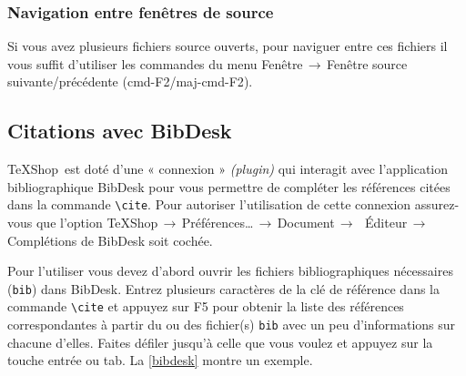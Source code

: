 \documentclass[11pt,french]{article}
\newcommand{\TS}{\textsf{\TeX Shop}}
\newcommand{\cmd}[1]{\textsf{#1}}
\newcommand{\mnu}[1]{\textsf{#1}}
\newcommand{\To}{\,\(\to\)\,}
\begin{document}
\subsubsection{Navigation entre fenêtres de source}

Si vous avez plusieurs fichiers source ouverts, pour naviguer entre ces fichiers il vous suffit d'utiliser les commandes du menu \mnu{Fenêtre}\To\mnu{Fenêtre source suivante/précédente} (\cmd{cmd-F2}/\cmd{maj-cmd-F2}).


\subsection{Citations avec \cmd{BibDesk}}

\TS\ est doté d'une « connexion » \emph{(plugin)} qui interagit avec l'application bibliographique \cmd{BibDesk} pour vous permettre de compléter les références citées dans la commande \verb|\cite|. Pour autoriser l'utilisation de cette connexion assurez-vous que l'option \mnu{TeXShop}\To\mnu{Préférences…}\To\mnu{Document}\To\ \mnu{Éditeur}\To\mnu{Complétions de BibDesk} soit cochée.

Pour l'utiliser vous devez d'abord ouvrir les fichiers bibliographiques nécessaires (\texttt{bib}) dans \cmd{BibDesk}. Entrez plusieurs caractères de la clé de référence dans la commande \verb|\cite| et appuyez sur \cmd{F5} pour obtenir la liste des références correspondantes à partir du ou des fichier(s) \texttt{bib} avec un peu d'informations sur chacune d'elles. Faites défiler jusqu'à celle que vous voulez et appuyez sur la touche \cmd{entrée} ou \cmd{tab}. La \vref{bibdesk} montre un exemple.
\end{document}
